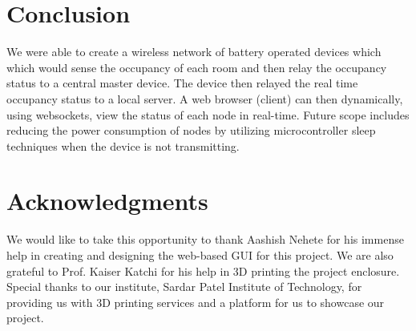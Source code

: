 \documentclass[journal]{IEEEtran}
\begin{document}
\section{Conclusion}
We were able to create a wireless network of battery operated devices which which would  sense the occupancy of each room and then relay the occupancy status to a central master device. The device then relayed the real time occupancy status to a local server. A web browser (client) can then dynamically, using websockets, view the status of each node in real-time.
Future scope includes reducing the power consumption of nodes by utilizing microcontroller sleep techniques when the device is not transmitting.

\section*{Acknowledgments}

We would like to take this opportunity to thank Aashish Nehete for his immense help in creating and designing the web-based GUI for this project. We are also grateful to Prof. Kaiser Katchi for his help in 3D printing the project enclosure.
Special thanks to our institute, Sardar Patel Institute of Technology, for providing us with 3D printing services and a platform for us to showcase our project.


\ifCLASSOPTIONcaptionsoff
  \newpage
\fi




\end{document}
